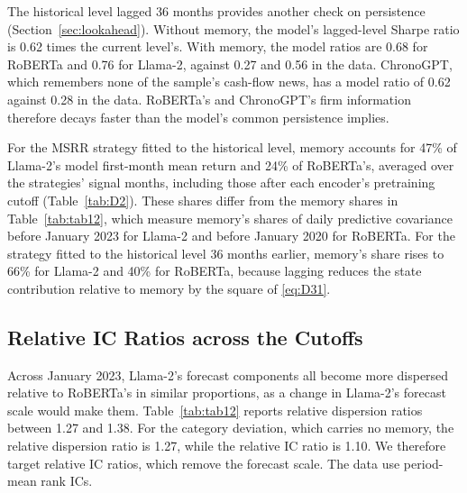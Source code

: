 \documentclass[11pt,letterpaper]{article}
\let\oldsubsection\subsection
\renewcommand{\subsection}{\FloatBarrier\oldsubsection}
\theoremstyle{remark}
\begin{document}
The historical level lagged 36 months provides another check on persistence (Section~\ref{sec:lookahead}). Without memory, the model's lagged-level Sharpe ratio is 0.62 times the current level's. With memory, the model ratios are 0.68 for RoBERTa and 0.76 for Llama-2, against 0.27 and 0.56 in the data. ChronoGPT, which remembers none of the sample's cash-flow news, has a model ratio of 0.62 against 0.28 in the data. RoBERTa's and ChronoGPT's firm information therefore decays faster than the model's common persistence implies.

For the MSRR strategy fitted to the historical level, memory accounts for 47\% of Llama-2's model first-month mean return and 24\% of RoBERTa's, averaged over the strategies' signal months, including those after each encoder's pretraining cutoff (Table~\ref{tab:D2}). These shares differ from the memory shares in Table~\ref{tab:tab12}, which measure memory's shares of daily predictive covariance before January 2023 for Llama-2 and before January 2020 for RoBERTa. For the strategy fitted to the historical level 36 months earlier, memory's share rises to 66\% for Llama-2 and 40\% for RoBERTa, because lagging reduces the state contribution relative to memory by the square of \eqref{eq:D31}.

\subsection{Relative IC Ratios across the Cutoffs}

Across January 2023, Llama-2's forecast components all become more dispersed relative to RoBERTa's in similar proportions, as a change in Llama-2's forecast scale would make them. Table~\ref{tab:tab12} reports relative dispersion ratios between 1.27 and 1.38. For the category deviation, which carries no memory, the relative dispersion ratio is 1.27, while the relative IC ratio is 1.10. We therefore target relative IC ratios, which remove the forecast scale. The data use period-mean rank ICs.
\end{document}
